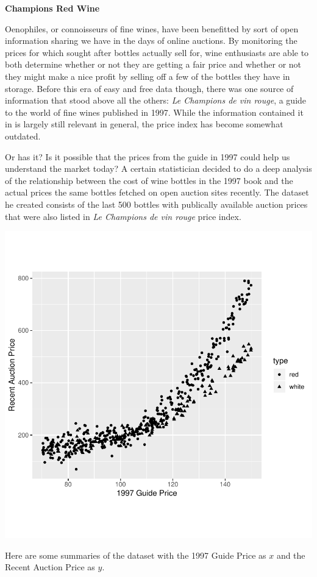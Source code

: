 \documentclass[addpoints]{examsetup}
\begin{document}




\examCoverPage

\begin{questions}

\question \textbf{Champions Red Wine}

Oenophiles, or connoisseurs of fine wines, have been benefitted by sort of open information sharing we have in the days of online auctions. 
By monitoring the prices for which sought after bottles actually sell for, wine enthusiasts are able to both determine whether or not they are getting a fair price and whether or not they might make a nice profit by selling off a few of the bottles they have in storage.
Before this era of easy and free data though, there was one source of information that stood above all the others: \textit{Le Champions de vin rouge}, a guide to the world of fine wines published in 1997.
While the information contained it in is largely still relevant in general, the price index has become somewhat outdated.

Or has it? 
Is it possible that the prices from the guide in 1997 could help us understand the market today?
A certain statistician decided to do a deep analysis of the relationship between the cost of wine bottles in the 1997 book and the actual prices the same bottles fetched on open auction sites recently. 
The dataset he created consists of the last 500 bottles with publically available auction prices that were also listed in \textit{Le Champions de vin rouge} price index.

\begin{center}
\includegraphics{stat305-pq2-003}
\end{center}
\pagebreak
Here are some summaries of the dataset with the 1997 Guide Price as $x$ and the Recent Auction Price as $y$.


\end{questions}
\end{document}
